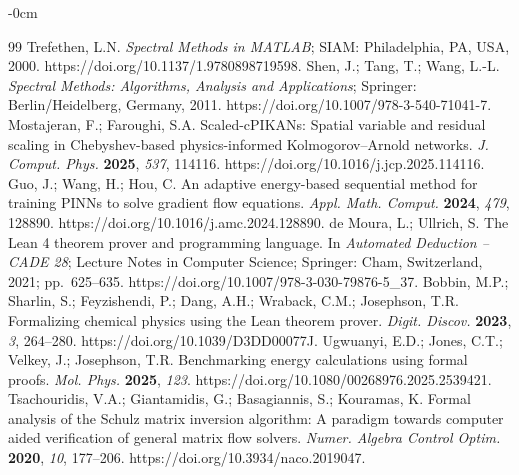 \documentclass[symmetry,article,submit,moreauthors]{Definitions/mdpi}
\begin{document}
\begin{adjustwidth}{-\extralength}{0cm}
\begin{thebibliography}{99}
 Trefethen, L.N. \textit{Spectral Methods in MATLAB}; SIAM: Philadelphia, PA, USA, 2000. https://doi.org/10.1137/1.9780898719598.
 Shen, J.; Tang, T.; Wang, L.-L. \textit{Spectral Methods: Algorithms, Analysis and Applications}; Springer: Berlin/Heidelberg, Germany, 2011. https://doi.org/10.1007/978-3-540-71041-7.
 Mostajeran, F.; Faroughi, S.A. Scaled-cPIKANs: Spatial variable and residual scaling in Chebyshev-based physics-informed Kolmogorov--Arnold networks. \textit{J. Comput. Phys.} \textbf{2025}, \textit{537}, 114116. https://doi.org/10.1016/j.jcp.2025.114116.
 Guo, J.; Wang, H.; Hou, C. An adaptive energy-based sequential method for training PINNs to solve gradient flow equations. \textit{Appl. Math. Comput.} \textbf{2024}, \textit{479}, 128890. https://doi.org/10.1016/j.amc.2024.128890.
 de Moura, L.; Ullrich, S. The Lean 4 theorem prover and programming language. In \textit{Automated Deduction -- CADE 28}; Lecture Notes in Computer Science; Springer: Cham, Switzerland, 2021; pp.\ 625--635. https://doi.org/10.1007/978-3-030-79876-5\_37.
 Bobbin, M.P.; Sharlin, S.; Feyzishendi, P.; Dang, A.H.; Wraback, C.M.; Josephson, T.R. Formalizing chemical physics using the Lean theorem prover. \textit{Digit. Discov.} \textbf{2023}, \textit{3}, 264--280. https://doi.org/10.1039/D3DD00077J.
 Ugwuanyi, E.D.; Jones, C.T.; Velkey, J.; Josephson, T.R. Benchmarking energy calculations using formal proofs. \textit{Mol. Phys.} \textbf{2025}, \textit{123}. https://doi.org/10.1080/00268976.2025.2539421.
 Tsachouridis, V.A.; Giantamidis, G.; Basagiannis, S.; Kouramas, K. Formal analysis of the Schulz matrix inversion algorithm: A paradigm towards computer aided verification of general matrix flow solvers. \textit{Numer. Algebra Control Optim.} \textbf{2020}, \textit{10}, 177--206. https://doi.org/10.3934/naco.2019047.
\end{thebibliography}
\end{adjustwidth}
\end{document}

